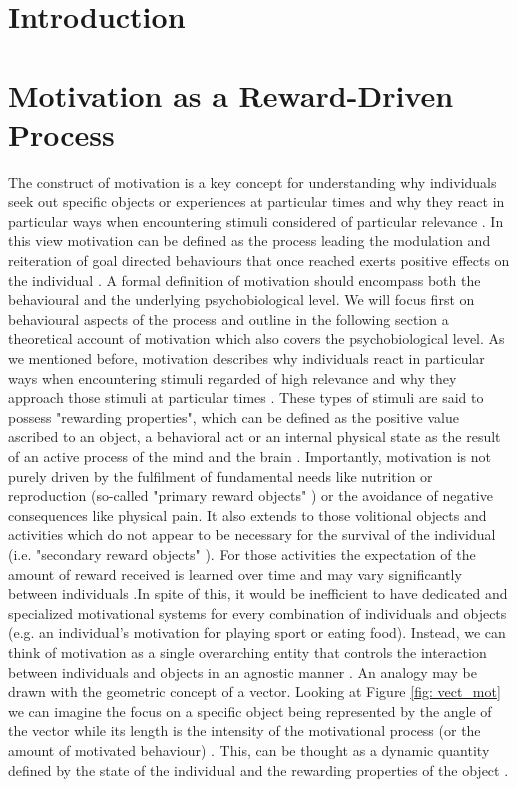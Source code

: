 \section{Introduction}
\label{motivation_engagement_introduction}
\lorem

\section{Motivation as a Reward-Driven Process}
\label{motivation}

The construct of motivation is a key concept for understanding why individuals seek out specific objects or experiences at particular times and why they react in particular ways when encountering stimuli considered of particular relevance \cite{berridge2004motivation}. In this view motivation can be defined as the process leading the modulation and reiteration of goal directed behaviours that once reached exerts positive effects on the individual \cite{simpson2016behavioral}. A formal definition of motivation should encompass both the behavioural and the underlying psychobiological level. We will focus first on behavioural aspects of the process and outline in the following section a theoretical account of motivation which also covers the psychobiological level. As we mentioned before, motivation describes why individuals react in particular ways when encountering stimuli regarded of high relevance and why they approach those stimuli at particular times \cite{berridge2004motivation}. These types of stimuli are said to possess "rewarding properties", which can be defined as the positive value ascribed to an object, a behavioral act or an internal physical state as the result of an active process of the mind and the brain \cite{schultz1997neural,berridge2008affective}. Importantly, motivation is not purely driven by the fulfilment of fundamental needs like nutrition or reproduction (so-called "primary reward objects" \cite{schultz2000reward}) or the avoidance of negative consequences like physical pain. It also extends to those volitional objects and activities which do not appear to be necessary for the survival of the individual (i.e. "secondary reward objects" \cite{berridge2008affective,sescousse2013processing}). For those activities the expectation of the amount of reward received is learned over time and may vary significantly between individuals \cite{berridge2008affective,simpson2016behavioral}.In spite of this, it would be inefficient to have dedicated and specialized motivational systems for every combination of individuals and objects (e.g. an individual's motivation for playing sport or eating food). Instead, we can think of motivation as a single overarching entity that controls the interaction between individuals and objects in an agnostic manner \cite{simpson2016behavioral}. An analogy may be drawn with the geometric concept of a vector. Looking at Figure \ref{fig: vect_mot} we can imagine the focus on a specific object being represented by the angle of the vector while its length is the intensity of the motivational process (or the amount of motivated behaviour) \cite{simpson2016behavioral}. This, can be thought as a dynamic quantity defined by the state of the individual and the rewarding properties of the object \cite{toates1994comparing,berridge2004motivation,zhang2009neural}.
